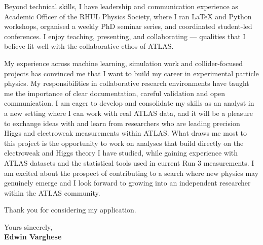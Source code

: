 \documentclass[11pt]{report}
\begin{document}
\begin{titlepage}
		Beyond technical skills, I have leadership and communication experience as Academic Officer of the RHUL Physics Society, where I ran LaTeX and Python workshops, organised a weekly PhD seminar series, and coordinated student-led conferences. I enjoy teaching, presenting, and collaborating --- qualities that I believe fit well with the collaborative ethos of ATLAS.\\
		\vspace{0.7em} 
		
		My experience across machine learning, simulation work and collider-focused projects has convinced me that I want to build my career in experimental particle physics. My responsibilities in collaborative research environments have taught me the importance of clear documentation, careful validation and open communication. I am eager to develop and consolidate my skills as an analyst in a new setting where I can work with real ATLAS data, and it will be a pleasure to exchange ideas with and learn from researchers who are leading precision Higgs and electroweak measurements within ATLAS. What draws me most to this project is the opportunity to work on analyses that build directly on the electroweak and Higgs theory I have studied, while gaining experience with ATLAS datasets and the statistical tools used in current Run 3 measurements. I am excited about the prospect of contributing to a search where new physics may genuinely emerge and I look forward to growing into an independent researcher within the ATLAS community.\\
		\vspace{0.7em}
		
		
		Thank you for considering my application.\\
		\vspace{5em}
		
		\raggedright Yours sincerely,\\
		\vspace{0.7em}
		\textbf{Edwin Varghese}
		
	\end{titlepage}
\end{document}
